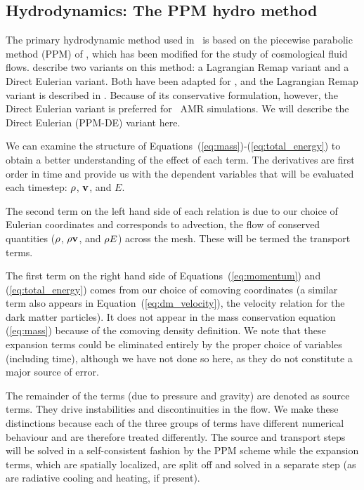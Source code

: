 \subsection{Hydrodynamics: The PPM hydro method}
\label{sec.hydro.ppm}

The primary hydrodynamic method used in \enzo\ is based on the
piecewise parabolic method (PPM) of
\citet{1984JCoPh..54..174C}, which has been
modified for the study of cosmological fluid flows.  
\citet{1984JCoPh..54..174C} describe two variants on this method: a
Lagrangian Remap variant and a Direct Eulerian variant.  Both have
been adapted for \enzo, and the Lagrangian Remap 
variant is described in \citet{1995CoPhC..89..149B}.  Because of its
conservative formulation, however, the Direct Eulerian variant is
preferred for \enzo\ AMR simulations.  We will describe the Direct
Eulerian (PPM-DE) variant here.

We can examine the structure of Equations~(\ref{eq:mass})-(\ref{eq:total_energy})
to obtain a better understanding of the effect of each term.
The derivatives are first order in time
and provide us with the dependent variables that will be evaluated each
timestep: $\rho$, $\mathbf{v}$, and $E$.

The second term on the left hand side of each relation
is due to our choice of Eulerian coordinates and corresponds to
advection, the flow of conserved quantities 
($\rho$, $\rho \mathbf{v}$, and $\rho E$) 
across the mesh.  These will be termed the transport terms.

The first term on the right hand side of Equations~(\ref{eq:momentum}) and
(\ref{eq:total_energy}) comes from our choice of comoving coordinates
(a similar term also appears in Equation~(\ref{eq:dm_velocity}), the velocity 
relation for the dark matter particles).  It does not
appear in the mass conservation equation (\ref{eq:mass}) because
of the comoving density definition.   
We note that these expansion terms could be
eliminated entirely by the proper choice of variables (including time),
although we have not done so here, as they do not constitute a major
source of error.

The remainder of the terms (due to pressure and gravity) are denoted as
source terms.  They drive instabilities and discontinuities in the flow.
We make these distinctions because each of the three
groups of terms have different numerical behaviour and are therefore
treated differently.  The source and transport steps will be solved in
a self-consistent fashion by the PPM scheme while the expansion terms,
which are spatially localized, are split off and solved in a separate step
(as are radiative cooling and heating, if present).  

